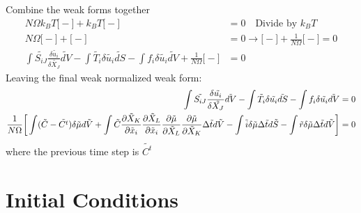 \documentclass[12pt,3p]{article}
\numberwithin{equation}{section}
\begin{document}
Combine the weak forms together 
\begin{align*}
N \Omega k_B T \bigg[ - \bigg] + k_B T \bigg[ - \bigg] &= 0 \quad \text{Divide by } k_B T \\
N \Omega \bigg[ - \bigg] + \bigg[ - \bigg] &= 0 \rightarrow \bigg[ - \bigg] + \frac{1}{N \Omega} \bigg[ - \bigg] = 0 \\
\int \tilde{S_{iJ}}  \frac{\delta \tilde{u_i}}{\delta \tilde{X_J}} \tilde{dV} - \int \tilde{T_i} \delta \tilde{u_{i}} \tilde{dS} - \int f_i \delta \tilde{u_i} \tilde{dV} + \frac{1}{N \Omega} \bigg[ - \bigg] &= 0 
\end{align*}
Leaving the final weak normalized weak form: 
\begin{align*}
\int \tilde{S_{iJ}}  \frac{\delta \tilde{u_i}}{\delta \tilde{X_J}} \tilde{dV} - \int \tilde{T_i} \delta \tilde{u_{i}} \tilde{dS} - \int f_i \delta \tilde{u_i} \tilde{dV} &= 0 \\
\frac{1}{N \Omega} \bigg[ \int (\tilde{C} - \tilde{C^t}) \delta \tilde{\mu} d\tilde{V} + \int \tilde{C} \pdv{\tilde{X}_K}{\tilde{x}_i} \pdv{\tilde{X}_L}{\tilde{x}_i} \pdv{\tilde{\mu}}{\tilde{X}_L} \pdv{\tilde{\mu}}{\tilde{X}_K} \Delta \tilde{t} d \tilde{V} -  \int \tilde{i} \delta \tilde{\mu} \Delta \tilde{t} d \tilde{S} - \int \tilde{r} \delta \tilde{\mu} \Delta \tilde{t} d \tilde{V} \bigg] &= 0
\end{align*}
where the previous time step is $\tilde{C^t}$

\section{Initial Conditions}

\end{document}
